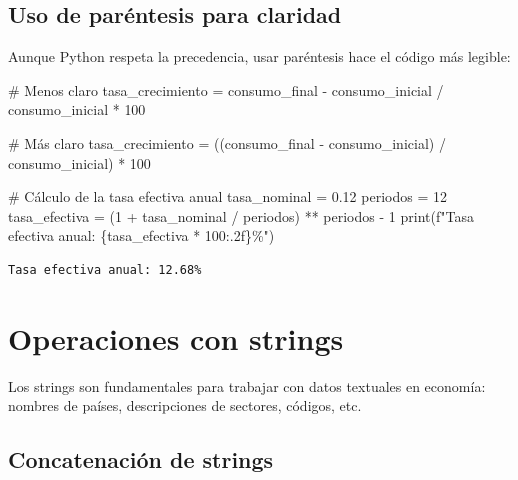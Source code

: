 \documentclass[
  doc,
  floatsintext,
  longtable,
  a4paper,
  nolmodern,
  notxfonts,
  notimes,
  12pt,
  colorlinks=true,linkcolor=blue,citecolor=blue,urlcolor=blue]{apa7}
\newenvironment{Shaded}{\begin{snugshade}}{\end{snugshade}}
\newcommand{\BuiltInTok}[1]{\textcolor[rgb]{0.00,0.23,0.31}{#1}}
\newcommand{\CommentTok}[1]{\textcolor[rgb]{0.37,0.37,0.37}{#1}}
\newcommand{\DecValTok}[1]{\textcolor[rgb]{0.68,0.00,0.00}{#1}}
\newcommand{\FloatTok}[1]{\textcolor[rgb]{0.68,0.00,0.00}{#1}}
\newcommand{\NormalTok}[1]{\textcolor[rgb]{0.00,0.23,0.31}{#1}}
\newcommand{\OperatorTok}[1]{\textcolor[rgb]{0.37,0.37,0.37}{#1}}
\newcommand{\SpecialCharTok}[1]{\textcolor[rgb]{0.37,0.37,0.37}{#1}}
\newcommand{\SpecialStringTok}[1]{\textcolor[rgb]{0.13,0.47,0.30}{#1}}
\begin{document}
\subsection{Uso de paréntesis para
claridad}\label{uso-de-paruxe9ntesis-para-claridad}

Aunque Python respeta la precedencia, usar paréntesis hace el código más
legible:

\begin{Shaded}
\begin{Highlighting}[]
\CommentTok{\# Menos claro}
\NormalTok{tasa\_crecimiento }\OperatorTok{=}\NormalTok{ consumo\_final }\OperatorTok{{-}}\NormalTok{ consumo\_inicial }\OperatorTok{/}\NormalTok{ consumo\_inicial }\OperatorTok{*} \DecValTok{100}

\CommentTok{\# Más claro}
\NormalTok{tasa\_crecimiento }\OperatorTok{=}\NormalTok{ ((consumo\_final }\OperatorTok{{-}}\NormalTok{ consumo\_inicial) }\OperatorTok{/}\NormalTok{ consumo\_inicial) }\OperatorTok{*} \DecValTok{100}

\CommentTok{\# Cálculo de la tasa efectiva anual}
\NormalTok{tasa\_nominal }\OperatorTok{=} \FloatTok{0.12}
\NormalTok{periodos }\OperatorTok{=} \DecValTok{12}
\NormalTok{tasa\_efectiva }\OperatorTok{=}\NormalTok{ (}\DecValTok{1} \OperatorTok{+}\NormalTok{ tasa\_nominal }\OperatorTok{/}\NormalTok{ periodos) }\OperatorTok{**}\NormalTok{ periodos }\OperatorTok{{-}} \DecValTok{1}
\BuiltInTok{print}\NormalTok{(}\SpecialStringTok{f"Tasa efectiva anual: }\SpecialCharTok{\{}\NormalTok{tasa\_efectiva }\OperatorTok{*} \DecValTok{100}\SpecialCharTok{:.2f\}}\SpecialStringTok{\%"}\NormalTok{)}
\end{Highlighting}
\end{Shaded}

\begin{verbatim}
Tasa efectiva anual: 12.68%
\end{verbatim}

\section{Operaciones con strings}\label{operaciones-con-strings}

Los strings son fundamentales para trabajar con datos textuales en
economía: nombres de países, descripciones de sectores, códigos, etc.

\subsection{Concatenación de strings}\label{concatenaciuxf3n-de-strings}
\end{document}
